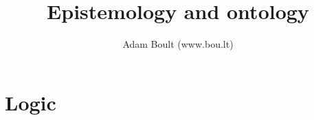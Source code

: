 \documentclass[oneside]{book}
\begin{document}
\author{Adam Boult (www.bou.lt)}
\title{Epistemology and ontology}
\maketitle

\setcounter{tocdepth}{0}
\tableofcontents



\part{Logic}

\end{document}
